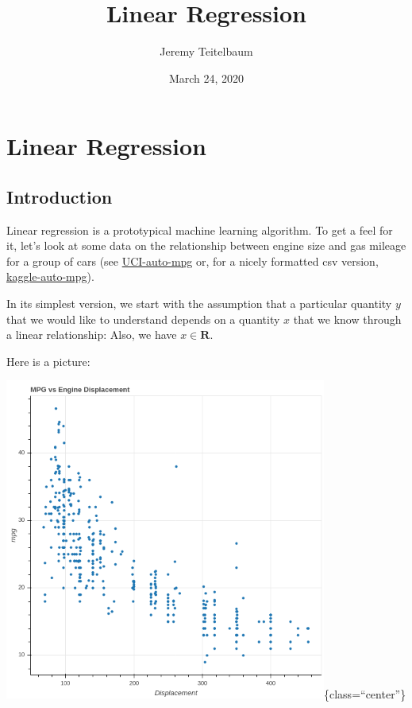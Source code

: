 \documentclass[
]{article}
\title{Linear Regression}
\author{Jeremy Teitelbaum}
\date{March 24, 2020}
\newcommand{\R}{\mathbf{R}}
\begin{document}
\maketitle

\hypertarget{linear-regression}{%
\section{Linear Regression}\label{linear-regression}}

\hypertarget{introduction}{%
\subsection{Introduction}\label{introduction}}

Linear regression is a prototypical machine learning algorithm. To get a
feel for it, let's look at some data on the relationship between engine
size and gas mileage for a group of cars (see
\href{https://archive.ics.uci.edu/ml/datasets/Auto+MPG}{UCI-auto-mpg}
or, for a nicely formatted csv version,
\href{https://www.kaggle.com/uciml/autompg-dataset}{kaggle-auto-mpg}).

In its simplest version, we start with the assumption that a particular
quantity \(y\) that we would like to understand depends on a quantity
\(x\) that we know through a linear relationship: Also, we have
\(x\in\R\).

Here is a picture:

\includegraphics[width=4.16667in,height=\textheight]{../img/mpg-vs-displacement.png}\{class=``center''\}
\end{document}
